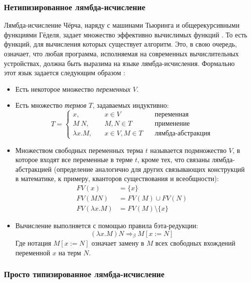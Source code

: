 \subsubsection{Нетипизированное лямбда-исчисление}

Лямбда-исчисление Чёрча, наряду с машинами Тьюринга и общерекурсивными функциями
Гёделя, задает множество эффективно вычислимых функций \cite{lambda-calculus-syntax-and-semantics}.
То есть функций, для вычисления которых существует алгоритм. Это, в свою очередь,
означает, что любая программа, исполняемая на современных вычислительных устройствах,
должна быть выразима на языке лямбда-исчисления. Формально этот язык задается следующим образом
\cite{lambda-calculus-syntax-and-semantics}:
\begin{itemize}
\item Есть некоторое множество \textit{переменных} \(V\).
\item Есть множество \textit{термов} \(T\), задаваемых индуктивно:
   \[
   T = \left\{
   \begin{array}{lrr}
   x,\quad& x \in V\quad&\text{переменная}\\
   M\ N,\quad& M, N \in T\quad&\text{применение}\\
   \lambda x. M,\quad& x \in V, M \in T\quad&\text{лямбда-абстракция}
   \end{array}
   \right.
   \]
\item Множеством свободных переменных терма \(t\) называется подмножество \(V\),
   в которое входят все переменные в терме \(t\), кроме тех, что связаны
   лямбда-абстракцией (определение аналогично для других связывающих
   конструкций в математике, к примеру, кванторов существования и всеобщности):
   \begin{align*}
   FV(x) &= \{x\}\\
   FV(M N) &= FV(M) \cup FV(N)\\
   FV(\lambda x. M) &= FV(M) \setminus \{x\}
   \end{align*}
\item Вычисление выполняется с помощью правила бэта-редукции:
   \[
   (\lambda x. M) N \Rightarrow_\beta M[x := N]
   \]
   Где нотация \(M[x := N]\) означает замену в \(M\) всех свободных вхождений переменной
   \(x\) на терм \(N\).
\end{itemize}

\subsubsection{Просто типизированное лямбда-исчисление}

